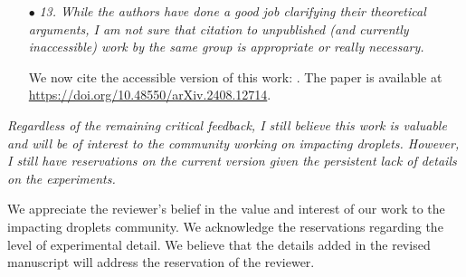 \documentclass[]{article}
\begin{document}
\begin{enumerate}
	\item[$\bullet$] \textit{13. While the authors have done a good job clarifying their theoretical arguments, I am not sure that citation to unpublished (and currently inaccessible) work by the same group is appropriate or really necessary.}
	
	We now cite the accessible version of this work: \citet{sanjay2024PRL}. The paper is available at \href{https://doi.org/10.48550/arXiv.2408.12714}{https://doi.org/10.48550/arXiv.2408.12714}.
	
\end{enumerate}

\textit{Regardless of the remaining critical feedback, I still believe this work is valuable and will be of interest to the community working on impacting droplets. However, I still have reservations on the current version given the persistent lack of details on the experiments.}

We appreciate the reviewer's belief in the value and interest of our work to the impacting droplets community. We acknowledge the reservations regarding the level of experimental detail. We believe that the details added in the revised manuscript will address the reservation of the reviewer. 
	
\printbibliography[title=References]
\end{document}
